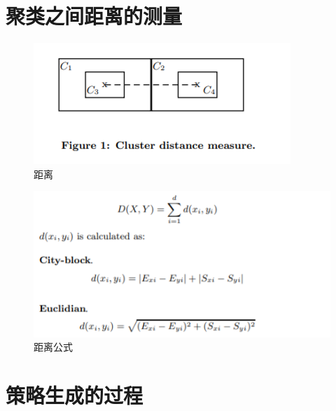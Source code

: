 \documentclass[UTF8]{ctexart}
\begin{document}
	\section{聚类之间距离的测量}\label{sec:disanjie}
	\begin{figure}[ht]
        \centering
        \includegraphics[scale=2.0]{picture/002.png}
        \caption{距离}
        \label{fig:002}
    \end{figure}
    \begin{figure}[ht]
        \centering
        \includegraphics[scale=2.0]{picture/003.png}
        \caption{距离公式}
        \label{fig:003}
    \end{figure}
	\clearpage
	\section{策略生成的过程}\label{sec:disijie}
\end{document}
